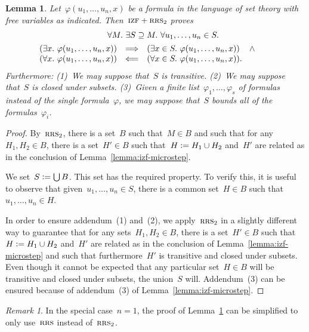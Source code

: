 \documentclass[oneside,reqno]{amsart}
\theoremstyle{definition}
\theoremstyle{plain}
\newtheorem{lemma}[defn]{Lemma}
\theoremstyle{remark}
\newtheorem{rem}[defn]{Remark}
\newcommand{\defeq}{\vcentcolon=}
\renewcommand{\_}{\mathpunct{.}\,}
\newcommand{\?}{\,{:}\,}
\newcommand{\IZF}{\textsc{izf}}
\newcommand{\RRS}{\textsc{rrs}}
\begin{document}
\begin{lemma}\label{lemma:izf-smallstep}
Let~$\varphi(u_1,\ldots,u_n,x)$ be a formula in the language of set
theory with free variables as indicated. Then~$\IZF+\RRS_2$ proves
\begin{multline*}
  {\qquad}\forall M\_
  \exists S \supseteq M\_
  \forall u_1,\ldots,u_n \in S\_ \\
  \begin{array}{@{}rcl@{}}
  (\exists x\_ \varphi(u_1,\ldots,u_n,x)) &\Longrightarrow&
  (\exists x \in S\_ \varphi(u_1,\ldots,u_n,x)) \quad\mathop{\wedge} \\
  (\forall x\_ \varphi(u_1,\ldots,u_n,x)) &\Longleftarrow&
  (\forall x \in S\_ \varphi(u_1,\ldots,u_n,x)).\end{array}
  {\qquad}
\end{multline*}
Furthermore: (1)~We may suppose that~$S$ is transitive. (2)~We may suppose
that~$S$ is closed under subsets. (3)~Given a finite
list~$\varphi_1,\ldots,\varphi_s$ of formulas instead of the single
formula~$\varphi$, we may suppose that~$S$ bounds all of the
formulas~$\varphi_i$.
\end{lemma}

\begin{proof}By~$\RRS_2$, there is a set~$B$ such that~$M \in B$ and such that
for any~$H_1, H_2 \in B$, there is a set~$H' \in B$ such that~$H \defeq H_1
\cup H_2$ and~$H'$ are related as in the conclusion of Lemma~\ref{lemma:izf-microstep}.

We set~$S \defeq \bigcup B$. This set has the required property. To verify
this, it is useful to observe that given~$u_1,\ldots,u_n \in S$, there is a
common set~$H \in B$ such that~$u_1,\ldots,u_n \in H$.

In order to ensure addendum~(1) and~(2), we apply~$\RRS_2$ in a slightly
different way to guarantee that for any sets~$H_1, H_2 \in B$, there is a
set~$H' \in B$ such that~$H \defeq H_1 \cup H_2$ and~$H'$ are related as in the
conclusion of Lemma~\ref{lemma:izf-microstep} and such that furthermore~$H'$ is
transitive and closed under subsets. Even though it cannot be expected that any
particular set~$H \in B$ will be transitive and closed under subsets, the
union~$S$ will. Addendum~(3) can be ensured because of addendum~(3) of
Lemma~\ref{lemma:izf-microstep}.
\end{proof}

\begin{rem}In the special case~$n = 1$, the proof of Lemma~\ref{lemma:izf-smallstep} can
be simplified to only use~$\RRS$ instead of~$\RRS_2$.\end{rem}
\end{document}
